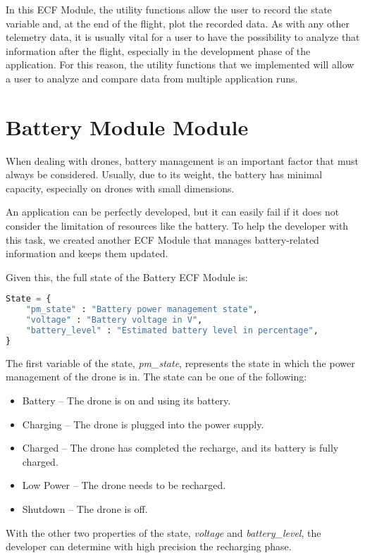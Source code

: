 In this ECF Module, the utility functions allow the user to record the state variable and, at the end of the flight, plot the recorded data.
As with any other telemetry data, it is usually vital for a user to have the possibility to analyze that information after the flight, especially in the development phase of the application.
For this reason, the utility functions that we implemented will allow a user to analyze and compare data from multiple application runs.


\section{Battery Module Module}\label{sec:module_battery}

When dealing with drones, battery management is an important factor that must always be considered. 
Usually, due to its weight, the battery has minimal capacity, especially on drones with small dimensions.

An application can be perfectly developed, but it can easily fail if it does not consider the limitation of resources like the battery.
To help the developer with this task, we created another ECF Module that manages battery-related information and keeps them updated.

Given this, the full state of the Battery ECF Module is:
\begin{lstlisting}[language=Python]
State = {
	"pm_state" : "Battery power management state",
	"voltage" : "Battery voltage in V",
	"battery_level" : "Estimated battery level in percentage",
}
\end{lstlisting}

The first variable of the state, \textit{pm\_state}, represents the state in which the power management of the drone is in.
The state can be one of the following:
\begin{itemize}
    \item Battery -- The drone is on and using its battery.
    \item Charging -- The drone is plugged into the power supply.
    \item Charged -- The drone has completed the recharge, and its battery is fully charged.
    \item Low Power -- The drone needs to be recharged.
    \item Shutdown -- The drone is off.
\end{itemize}

With the other two properties of the state, \textit{voltage} and \textit{battery\_level}, the developer can determine with high precision the recharging phase.

